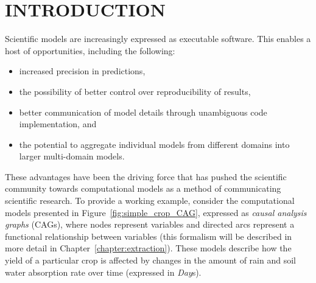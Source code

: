 \chapter{INTRODUCTION\label{chapter:introduction}}
Scientific models are increasingly expressed as executable software.
This enables a host of opportunities, including the following:
\begin{itemize}
\item increased precision in predictions,
\item the possibility of better control over reproducibility of results,
\item better communication of model details through unambiguous code implementation, and
\item the potential to aggregate individual models from different domains into larger multi-domain models.
\end{itemize}

These advantages have been the driving force that has pushed the scientific community towards computational models as a method of communicating scientific research.
To provide a working example, consider the computational models presented in Figure~\ref{fig:simple_crop_CAG}, expressed as \emph{causal analysis graphs} (CAGs), where nodes represent variables and directed arcs represent a functional relationship between variables (this formalism will be described in more detail in Chapter~\ref{chapter:extraction}).
These models describe how the yield of a particular crop is affected by changes in the amount of rain and soil water absorption rate over time (expressed in \emph{Day}s).

